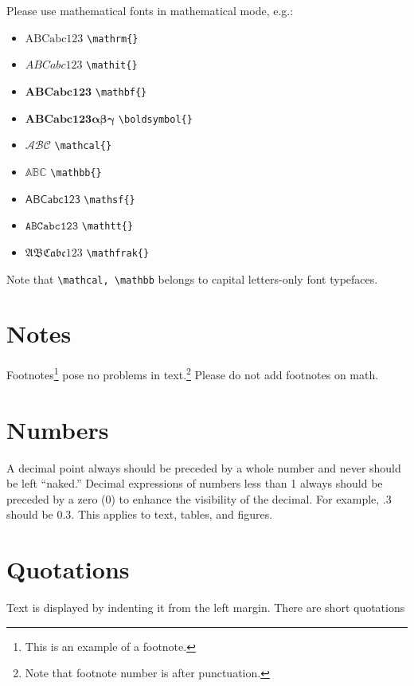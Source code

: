 \documentclass[qe,nameyear,final,openaccess]{econsocart}
\theoremstyle{plain}
\begin{document}
Please use mathematical fonts in mathematical mode, e.g.:

\begin{itemize}
\item $\mathrm{ABCabc123}$ \texttt{{\textbackslash}mathrm\{\}}
\item $\mathit{ABCabc123}$ \texttt{{\textbackslash}mathit\{\}}
\item $\mathbf{ABCabc123}$ \texttt{{\textbackslash}mathbf\{\}}
\item $\boldsymbol{ABCabc123\alpha\beta\gamma}$ \texttt{{\textbackslash}boldsymbol\{\}}
\item $\mathcal{ABC}$ \texttt{{\textbackslash}mathcal\{\}}
\item $\mathbb{ABC}$ \texttt{{\textbackslash}mathbb\{\}}
\item $\mathsf{ABCabc123}$ \texttt{{\textbackslash}mathsf\{\}}
\item $\mathtt{ABCabc123}$ \texttt{{\textbackslash}mathtt\{\}}
\item $\mathfrak{ABCabc123}$ \texttt{{\textbackslash}mathfrak\{\}}
\end{itemize}

Note that \texttt{{\textbackslash}mathcal, {\textbackslash}mathbb} belongs to capital letters-only font typefaces.

\section{Notes}

Footnotes\footnote{This is an example of a footnote.}
pose no problems in text.\footnote{Note that footnote number is after punctuation.} Please do not add footnotes on math.

\section{Numbers}

A decimal point always should be preceded by a whole number and never should be left ``naked.'' Decimal expressions of numbers less than 1 always should be preceded by a zero (0) to enhance the visibility of the decimal. For example, .3 should be 0.3. This applies to text, tables, and figures.

\section{Quotations}

Text is displayed by indenting it from the left margin. There are short quotations
\end{document}
